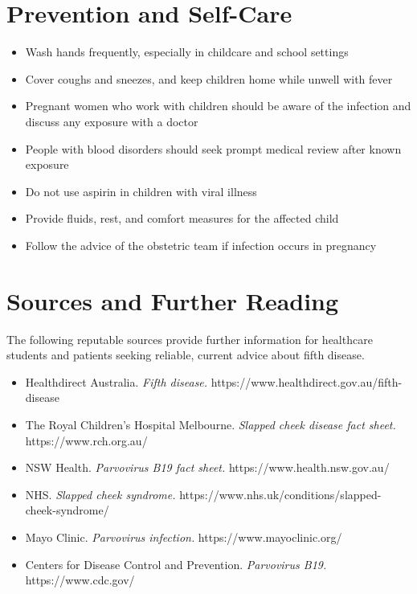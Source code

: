 \section*{Prevention and Self-Care}
\begin{itemize}
    \item Wash hands frequently, especially in childcare and school settings
    \item Cover coughs and sneezes, and keep children home while unwell with fever
    \item Pregnant women who work with children should be aware of the infection and discuss any exposure with a doctor
    \item People with blood disorders should seek prompt medical review after known exposure
    \item Do not use aspirin in children with viral illness
    \item Provide fluids, rest, and comfort measures for the affected child
    \item Follow the advice of the obstetric team if infection occurs in pregnancy
\end{itemize}

\section*{Sources and Further Reading}
The following reputable sources provide further information for healthcare students and patients seeking reliable, current advice about fifth disease.
\begin{itemize}
    \item Healthdirect Australia. \textit{Fifth disease.} https://www.healthdirect.gov.au/fifth-disease
    \item The Royal Children's Hospital Melbourne. \textit{Slapped cheek disease fact sheet.} https://www.rch.org.au/
    \item NSW Health. \textit{Parvovirus B19 fact sheet.} https://www.health.nsw.gov.au/
    \item NHS. \textit{Slapped cheek syndrome.} https://www.nhs.uk/conditions/slapped-cheek-syndrome/
    \item Mayo Clinic. \textit{Parvovirus infection.} https://www.mayoclinic.org/
    \item Centers for Disease Control and Prevention. \textit{Parvovirus B19.} https://www.cdc.gov/
\end{itemize}
